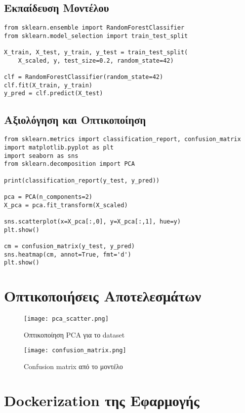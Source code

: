 \documentclass[a4paper,12pt]{article}
\begin{document}
\subsection{Εκπαίδευση Μοντέλου}
\begin{lstlisting}
from sklearn.ensemble import RandomForestClassifier
from sklearn.model_selection import train_test_split

X_train, X_test, y_train, y_test = train_test_split(
    X_scaled, y, test_size=0.2, random_state=42)

clf = RandomForestClassifier(random_state=42)
clf.fit(X_train, y_train)
y_pred = clf.predict(X_test)
\end{lstlisting}

\subsection{Αξιολόγηση και Οπτικοποίηση}
\begin{lstlisting}
from sklearn.metrics import classification_report, confusion_matrix
import matplotlib.pyplot as plt
import seaborn as sns
from sklearn.decomposition import PCA

print(classification_report(y_test, y_pred))

pca = PCA(n_components=2)
X_pca = pca.fit_transform(X_scaled)

sns.scatterplot(x=X_pca[:,0], y=X_pca[:,1], hue=y)
plt.show()

cm = confusion_matrix(y_test, y_pred)
sns.heatmap(cm, annot=True, fmt='d')
plt.show()
\end{lstlisting}

\section{Οπτικοποιήσεις Αποτελεσμάτων}

\begin{figure}[h]
  \centering
  \texttt{[image: pca\_scatter.png]}
  \caption{Οπτικοποίηση PCA για το dataset}
\end{figure}

\begin{figure}[h]
  \centering
  \texttt{[image: confusion\_matrix.png]}
  \caption{Confusion matrix από το μοντέλο}
\end{figure}

\section{Dockerization της Εφαρμογής}
\end{document}
